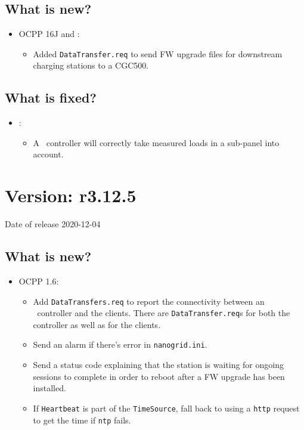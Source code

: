 \documentclass{scrartcl}
\begin{document}
\subsection*{What is new?}
\begin{itemize}
\item OCPP 16J and \nanogrid:
  \begin{itemize}
  \item Added \verb|DataTransfer.req| to send FW upgrade files for downstream
    charging stations to a CGC500.
  \end{itemize}
\end{itemize}
\subsection*{What is fixed?}
\begin{itemize}
\item \nanogrid:
  \begin{itemize}
  \item A \nanogrid\ controller will correctly  take measured loads in a
    sub-panel into account.
  \end{itemize}
\end{itemize}

\section{Version: r3.12.5}
Date of release 2020-12-04
\subsection*{What is new?}
\begin{itemize}
\item OCPP 1.6:
  \begin{itemize}
  \item Add \verb|DataTransfers.req| to report the connectivity between an
    \nanogrid\ controller and the clients. There are \verb|DataTransfer.req|s
    for both the controller as well as for the clients.
  \item Send an alarm if there's error in \verb|nanogrid.ini|.
  \item Send a status code explaining that the station is waiting for ongoing
    sessions to complete in order to reboot after a FW upgrade has been
    installed.
  \item If \verb|Heartbeat| is part of the \verb|TimeSource|, fall back to
    using a \verb|http| request to get the time if \verb|ntp| fails.
  \end{itemize}
\end{itemize}
\end{document}

